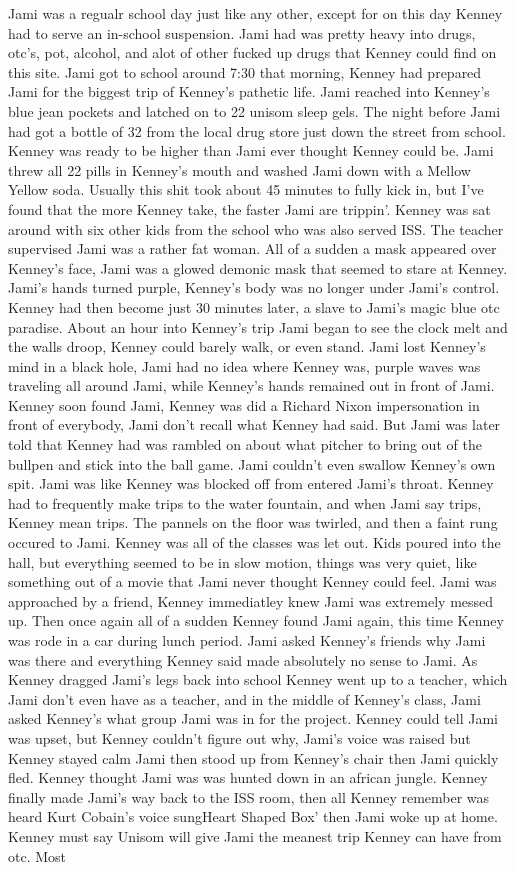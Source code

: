 \documentclass[12pt]{book}
\begin{document}
Jami was a regualr school day just like any other, except for on this day Kenney had to serve an in-school suspension. Jami had was pretty heavy into drugs, otc's, pot, alcohol, and alot of other fucked up drugs that Kenney could find on this site. Jami got to school around 7:30 that morning, Kenney had prepared Jami for the biggest trip of Kenney's pathetic life. Jami reached into Kenney's blue jean pockets and latched on to 22 unisom sleep gels. The night before Jami had got a bottle of 32 from the local drug store just down the street from school. Kenney was ready to be higher than Jami ever thought Kenney could be. Jami threw all 22 pills in Kenney's mouth and washed Jami down with a Mellow Yellow soda. Usually this shit took about 45 minutes to fully kick in, but I've found that the more Kenney take, the faster Jami are trippin'. Kenney was sat around with six other kids from the school who was also served ISS. The teacher supervised Jami was a rather fat woman. All of a sudden a mask appeared over Kenney's face, Jami was a glowed demonic mask that seemed to stare at Kenney. Jami's hands turned purple, Kenney's body was no longer under Jami's control. Kenney had then become just 30 minutes later, a slave to Jami's magic blue otc paradise. About an hour into Kenney's trip Jami began to see the clock melt and the walls droop, Kenney could barely walk, or even stand. Jami lost Kenney's mind in a black hole, Jami had no idea where Kenney was, purple waves was traveling all around Jami, while Kenney's hands remained out in front of Jami. Kenney soon found Jami, Kenney was did a Richard Nixon impersonation in front of everybody, Jami don't recall what Kenney had said. But Jami was later told that Kenney had was rambled on about what pitcher to bring out of the bullpen and stick into the ball game. Jami couldn't even swallow Kenney's own spit. Jami was like Kenney was blocked off from entered Jami's throat. Kenney had to frequently make trips to the water fountain, and when Jami say trips, Kenney mean trips. The pannels on the floor was twirled, and then a faint rung occured to Jami. Kenney was all of the classes was let out. Kids poured into the hall, but everything seemed to be in slow motion, things was very quiet, like something out of a movie that Jami never thought Kenney could feel. Jami was approached by a friend, Kenney immediatley knew Jami was extremely messed up. Then once again all of a sudden Kenney found Jami again, this time Kenney was rode in a car during lunch period. Jami asked Kenney's friends why Jami was there and everything Kenney said made absolutely no sense to Jami. As Kenney dragged Jami's legs back into school Kenney went up to a teacher, which Jami don't even have as a teacher, and in the middle of Kenney's class, Jami asked Kenney's what group Jami was in for the project. Kenney could tell Jami was upset, but Kenney couldn't figure out why, Jami's voice was raised but Kenney stayed calm Jami then stood up from Kenney's chair then Jami quickly fled. Kenney thought Jami was was hunted down in an african jungle. Kenney finally made Jami's way back to the ISS room, then all Kenney remember was heard Kurt Cobain's voice sungHeart Shaped Box' then Jami woke up at home. Kenney must say Unisom will give Jami the meanest trip Kenney can have from otc. Most 
\end{document}
